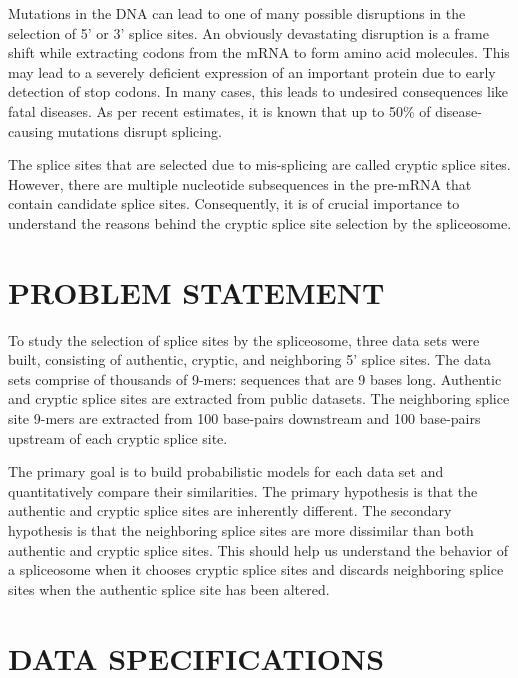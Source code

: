 \documentclass[12pt,a4paper]{article}
\begin{document}
	Mutations in the DNA can lead to one of many possible disruptions in the selection of 5’ or 3’ splice sites. An obviously devastating disruption is a frame shift while extracting codons from the mRNA to form amino acid molecules. This may lead to a severely deficient expression of an important protein due to early detection of stop codons. In many cases, this leads to undesired consequences like fatal diseases. As per recent estimates, it is known that up to 50\% of disease-causing mutations disrupt splicing. \par
	The splice sites that are selected due to mis-splicing are called cryptic splice sites. However, there are multiple nucleotide subsequences in the pre-mRNA that contain candidate splice sites. Consequently, it is of crucial importance to understand the reasons behind the cryptic splice site selection by the spliceosome.
	

	\section{\large PROBLEM STATEMENT}
	To study the selection of splice sites by the spliceosome, three data sets were built, consisting of authentic, cryptic, and neighboring 5’ splice sites. The data sets comprise of thousands of 9-mers: sequences that are 9 bases long. Authentic and cryptic splice sites are extracted from public datasets. The neighboring splice site 9-mers are extracted from 100 base-pairs downstream and 100 base-pairs upstream of each cryptic splice site. \par
	The primary goal is to build probabilistic models for each data set and quantitatively compare their similarities. The primary hypothesis is that the authentic and cryptic splice sites are inherently different. The secondary hypothesis is that the neighboring splice sites are more dissimilar than both authentic and cryptic splice sites. This should help us understand the behavior of a spliceosome when it chooses cryptic splice sites and discards neighboring splice sites when the authentic splice site has been altered.
    
    \section{DATA SPECIFICATIONS}
\end{document}
